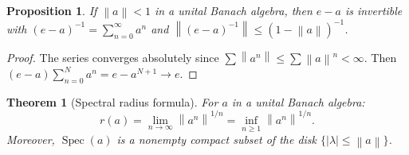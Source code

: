 \documentclass[a4paper,12pt]{book}
\DeclareMathOperator{\Spec}{Spec}
\newcommand{\norm}[1]{\left\| #1 \right\|}
\newcommand{\abs}[1]{\left| #1 \right|}
\theoremstyle{definition}
\theoremstyle{plain}
\newtheorem{theorem}[definition]{Theorem}
\newtheorem{proposition}[definition]{Proposition}
\theoremstyle{remark}
\begin{document}
\begin{proposition}\label{prop:neumann-series}
If $\norm{a} < 1$ in a unital Banach algebra, then $e - a$ is invertible with
$(e - a)^{-1} = \sum_{n=0}^\infty a^n$ and
$\norm{(e-a)^{-1}} \le (1 - \norm{a})^{-1}$.
\end{proposition}

\begin{proof}
The series converges absolutely since $\sum \norm{a^n} \le \sum \norm{a}^n < \infty$.
Then $(e - a)\sum_{n=0}^N a^n = e - a^{N+1} \to e$.
\end{proof}

\begin{theorem}[Spectral radius formula]\label{thm:spectral-radius}
For $a$ in a unital Banach algebra:
\[
  r(a) = \lim_{n \to \infty} \norm{a^n}^{1/n} = \inf_{n \ge 1} \norm{a^n}^{1/n}.
\]
Moreover, $\Spec(a)$ is a nonempty compact subset of the disk $\{\abs{\lambda} \le \norm{a}\}$.
\end{theorem}
\end{document}

